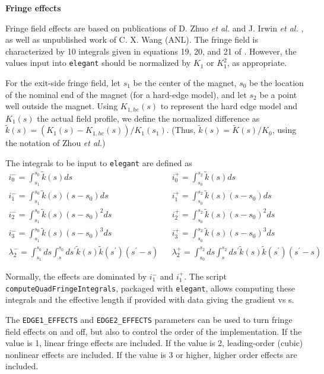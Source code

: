 {\bf Fringe effects}

Fringe field effects  are based on publications of D.  Zhuo {\em et al.} \cite{Zhou-IPAC10} and  J. Irwin {\em et
  al.} \cite{Irwin-PAC95}, as well as unpublished work of C. X. Wang (ANL).  The fringe field is characterized by 
10 integrals given in equations 19, 20, and 21 of \cite{Zhou-IPAC10}.  However, the values input into {\tt elegant}
should be normalized by $K_1$ or $K_1^2$, as appropriate.

For the exit-side fringe field, let $s_1$ be the center of the magnet, $s_0$ be the location of the nominal end of the magnet
(for a hard-edge model), and let $s_2$ be a point well outside the magnet.  
Using $K_{1,he}(s)$ to represent the hard edge model and $K_1(s)$ the actual field profile, we 
define the normalized difference as $\tilde{k}(s) = (K_1(s) - K_{1,he}(s))/K_1(s_1)$.  (Thus, $\tilde{k}(s) = \tilde{K}(s)/K_0$, using
the notation of Zhou {\em et al.})

The integrals to be input to {\tt elegant} are defined as 
\begin{eqnarray}
i_0^- = \int_{s_1}^{s_0} \tilde{k}(s) ds & & i_0^+ = \int_{s_0}^{s_2} \tilde{k}(s) ds \\
i_1^- = \int_{s_1}^{s_0} \tilde{k}(s) (s-s_0) ds & & i_1^+ = \int_{s_0}^{s_2} \tilde{k}(s) (s-s_0) ds \\
i_2^- = \int_{s_1}^{s_0} \tilde{k}(s) (s-s_0)^2 ds & & i_2^+ = \int_{s_0}^{s_2} \tilde{k}(s) (s-s_0)^2 ds \\
i_3^- = \int_{s_1}^{s_0} \tilde{k}(s) (s-s_0)^3 ds & & i_3^+ = \int_{s_0}^{s_2} \tilde{k}(s) (s-s_0)^3 ds \\
\lambda_2^- = \int_{s_1}^{s_0} ds \int_s^{s_0} ds^\prime \tilde{k}(s) \tilde{k}(s^\prime) (s^\prime-s) & & 
\lambda_2^+ = \int_{s_0}^{s_2} ds \int_s^{s_2} ds^\prime \tilde{k}(s) \tilde{k}(s^\prime) (s^\prime-s) 
\end{eqnarray}

Normally, the effects are dominated by $i_1^-$ and $i_1^+$.  The script \verb|computeQuadFringeIntegrals|,
packaged with \verb|elegant|, allows computing these integrals and the effective length if provided with 
data giving the gradient vs s.

The \verb|EDGE1_EFFECTS| and \verb|EDGE2_EFFECTS| parameters can be used to turn fringe field effects on and off, but also
to control the order of the implementation.  If the value is 1, linear fringe effects are included.  If the value is 2, 
leading-order (cubic) nonlinear effects are included.  If the value is 3 or higher, higher order effects are included.

